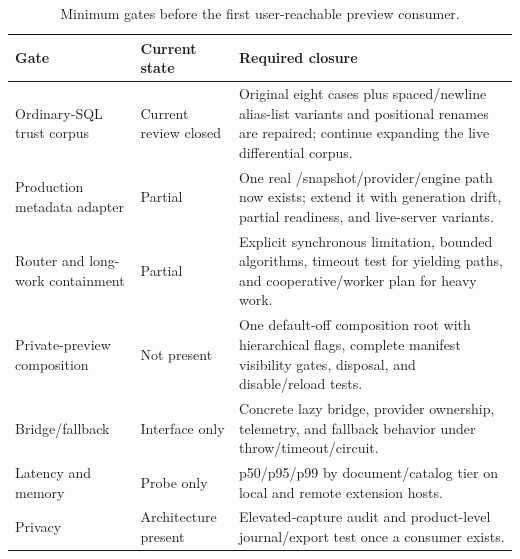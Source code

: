 \documentclass[11pt]{article}
\newcommand{\code}[1]{\texttt{\detokenize{#1}}}
\begin{document}
\begin{table}[H]
\centering
\small
\caption{Minimum gates before the first user-reachable preview consumer.}
\label{tab:activation-gates}
\begin{tabularx}{\textwidth}{@{}p{}p{}X@{}}
\toprule
\textbf{Gate} & \textbf{Current state} & \textbf{Required closure}\\
\midrule
Ordinary-SQL trust corpus & Current review closed & Original eight cases plus spaced/newline alias-list variants and positional renames are repaired; continue expanding the live differential corpus.\\
Production metadata adapter & Partial & One real \code{CatalogBuilder}/snapshot/provider/engine path now exists; extend it with generation drift, partial readiness, and live-server variants.\\
Router and long-work containment & Partial & Explicit synchronous limitation, bounded algorithms, timeout test for yielding paths, and cooperative/worker plan for heavy work.\\
Private-preview composition & Not present & One default-off composition root with hierarchical flags, complete manifest visibility gates, disposal, and disable/reload tests.\\
Bridge/fallback & Interface only & Concrete lazy bridge, provider ownership, telemetry, and fallback behavior under throw/timeout/circuit.\\
Latency and memory & Probe only & p50/p95/p99 by document/catalog tier on local and remote extension hosts.\\
Privacy & Architecture present & Elevated-capture audit and product-level journal/export test once a consumer exists.\\
\bottomrule
\end{tabularx}
\end{table}
\end{document}
